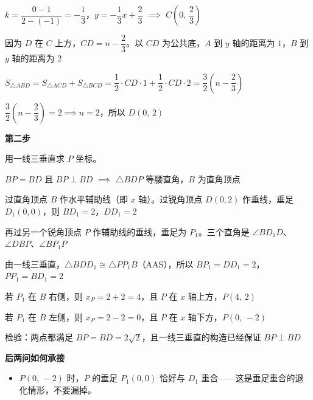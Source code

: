 \documentclass{exam-zh}
\newcommand{\eduSubTitle}[1]{%
  \needspace{4\baselineskip}%
  \vspace{1mm}
  {\color{edu-blue}\bfseries #1}\par
  \vspace{1mm}
}
\newenvironment{eduSubQuestionItem}[1]{%
  \needspace{4\baselineskip}%
  \vspace{2mm}
  \par\noindent
  \hangindent=8mm\hangafter=1
  {\color{edu-blue}\bfseries #1}\enspace
  \begingroup
  \color{edu-ink}
}{%
  \endgroup
  \par
  \vspace{3mm}
}
\newenvironment{eduBulletList}{%
  \begin{itemize}[
    label=\textbullet,
    leftmargin=5mm,
    itemsep=1.2mm,
    topsep=0pt,
    parsep=0pt
  ]
}{%
  \end{itemize}
}
\begin{document}
\begingroup
\setlength{\parskip}{2.5mm}
$k = \dfrac{0 - 1}{2 - (-1)} = -\dfrac{1}{3}$，$y = -\dfrac{1}{3}x + \dfrac{2}{3}$ $\implies$ $C\!\left(0,\,\dfrac{2}{3}\right)$\par
因为 $D$ 在 $C$ 上方，$CD=n-\dfrac{2}{3}$。以 $CD$ 为公共底，$A$ 到 $y$ 轴的距离为 $1$，$B$ 到 $y$ 轴的距离为 $2$\par
$S_{\triangle ABD}=S_{\triangle ACD}+S_{\triangle BCD}=\dfrac12\cdot CD\cdot1+\dfrac12\cdot CD\cdot2=\dfrac32\left(n-\dfrac23\right)$\par
$\dfrac32\left(n-\dfrac23\right)=2 \implies n=2$，所以 $D(0,\,2)$\par
\endgroup





\begin{eduSubQuestionItem}{第二步}
用一线三垂直求 $P$ 坐标。\end{eduSubQuestionItem}

\begingroup
\setlength{\parskip}{2.5mm}
$BP = BD$ 且 $BP \perp BD$ $\implies$ $\triangle BDP$ 等腰直角，$B$ 为直角顶点\par
过直角顶点 $B$ 作水平辅助线（即 $x$ 轴）。过锐角顶点 $D(0,2)$ 作垂线，垂足 $D_1(0,0)$，则 $BD_1=2$，$DD_1=2$\par
再过另一个锐角顶点 $P$ 作辅助线的垂线，垂足为 $P_1$。三个直角是 $\angle BD_1D$、$\angle DBP$、$\angle BP_1P$\par
由一线三垂直，$\triangle BDD_1 \cong \triangle PP_1B$（AAS），所以 $BP_1=DD_1=2$，$PP_1=BD_1=2$\par
若 $P_1$ 在 $B$ 右侧，则 $x_P=2+2=4$，且 $P$ 在 $x$ 轴上方，$P(4,\,2)$\par
若 $P_1$ 在 $B$ 左侧，则 $x_P=2-2=0$，且 $P$ 在 $x$ 轴下方，$P(0,\,-2)$\par
检验：两点都满足 $BP=BD=2\sqrt2$，且一线三垂直的构造已经保证 $BP\perp BD$\par
\endgroup

\vspace{2mm}
\eduSubTitle{后两问如何承接}
\begin{eduBulletList}
  \item $P(0,\,-2)$ 时，$P$ 的垂足 $P_1(0,0)$ 恰好与 $D_1$ 重合——这是垂足重合的退化情形，不要漏掉。\end{eduBulletList}
\end{document}
